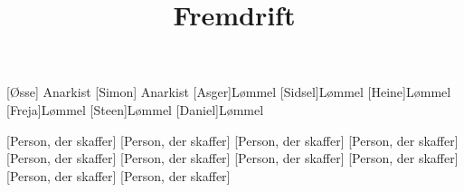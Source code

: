 \documentclass[a4paper,11pt]{article}
\title{Fremdrift}
\begin{document}
\maketitle

\begin{roles}
[Øsse] Anarkist
[Simon] Anarkist
[Asger]Lømmel
[Sidsel]Lømmel
[Heine]Lømmel
[Freja]Lømmel
[Steen]Lømmel
[Daniel]Lømmel
\end{roles}


\begin{props}
[Person, der skaffer]
[Person, der skaffer]
[Person, der skaffer]
[Person, der skaffer]
[Person, der skaffer]
[Person, der skaffer]
[Person, der skaffer]
[Person, der skaffer]
[Person, der skaffer]
[Person, der skaffer]
\end{props}
\end{document}
